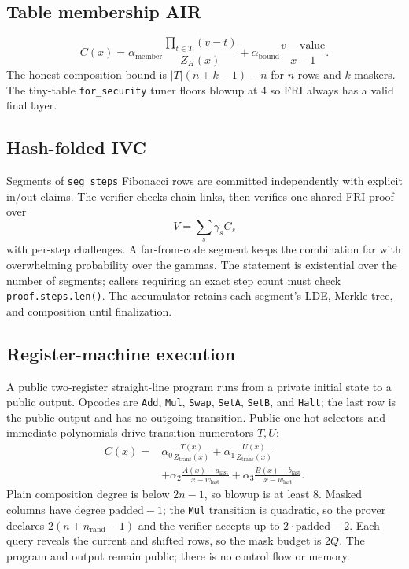 \documentclass[11pt,a4paper]{article}
\begin{document}
\subsection{Table membership AIR}

\[
C(x)=\alpha_{\mathrm{member}}\frac{\prod_{t\in T}(v-t)}{Z_H(x)}
+\alpha_{\mathrm{bound}}\frac{v-\mathrm{value}}{x-1}.
\]
The honest composition bound is $|T|(n+k-1)-n$ for $n$ rows and $k$ maskers.
The tiny-table \texttt{for\_security} tuner floors blowup at 4 so FRI always
has a valid final layer.

\subsection{Hash-folded IVC}

Segments of \texttt{seg\_steps} Fibonacci rows are committed independently
with explicit in/out claims. The verifier checks chain links, then verifies
one shared FRI proof over
\[
V=\sum_s\gamma_sC_s
\]
with per-step challenges. A far-from-code segment keeps the combination far
with overwhelming probability over the gammas. The statement is existential
over the number of segments; callers requiring an exact step count must check
\texttt{proof.steps.len()}. The accumulator retains each segment's LDE,
Merkle tree, and composition until finalization.

\subsection{Register-machine execution}

A public two-register straight-line program runs from a private initial state
to a public output. Opcodes are \texttt{Add}, \texttt{Mul}, \texttt{Swap},
\texttt{SetA}, \texttt{SetB}, and \texttt{Halt}; the last row is the public
output and has no outgoing transition. Public one-hot selectors and immediate
polynomials drive transition numerators $T,U$:
\[
\begin{aligned}
C(x)={}&\alpha_0\frac{T(x)}{Z_{\mathrm{trans}}(x)}
+\alpha_1\frac{U(x)}{Z_{\mathrm{trans}}(x)}\\
&+\alpha_2\frac{A(x)-a_{\mathrm{last}}}{x-w_{\mathrm{last}}}
+\alpha_3\frac{B(x)-b_{\mathrm{last}}}{x-w_{\mathrm{last}}}.
\end{aligned}
\]
Plain composition degree is below $2n-1$, so blowup is at least 8. Masked
columns have degree $\mathrm{padded}-1$; the \texttt{Mul} transition is
quadratic, so the prover declares $2(n+n_{\mathrm{rand}}-1)$ and the verifier
accepts up to $2\cdot\mathrm{padded}-2$. Each query reveals the current and
shifted rows, so the mask budget is $2Q$. The program and output remain
public; there is no control flow or memory.
\end{document}
